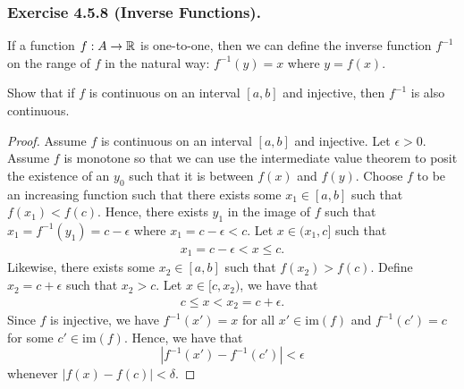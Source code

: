 \subsubsection{Exercise 4.5.8 (Inverse Functions).} If a function \( f: A \to \mathbb{R}  \) is one-to-one, then we can define the inverse function \( f^{-1}  \) on the range of \( f  \) in the natural way: \( f^{-1}(y) = x  \) where \( y = f(x)  \).

Show that if \( f  \) is continuous on an interval \( [a,b]  \) and injective, then \( f^{-1}  \) is also continuous.
\begin{proof}
    Assume \( f  \) is continuous on an interval \( [a,b] \) and injective. Let \( \epsilon > 0  \). Assume \( f  \) is monotone so that we can use the intermediate value theorem to posit the existence of an \( y_0  \) such that it is between \( f(x)  \) and \( f(y) \). Choose \( f  \) to be an increasing function such that there exists some \( x_1 \in [a,b] \) such that \( f(x_1) < f(c)  \). Hence, there exists \(  y_1  \) in the image of \( f  \) such that \( x_1 = f^{-1}(y_1) =  c - \epsilon  \) where \( x_1 = c - \epsilon  < c  \). Let \( x \in (x_1,c] \) such that 
    \begin{align}
        x_1 = c - \epsilon < x \leq c. 
    \end{align}
    Likewise, there exists some \( x_2 \in [a,b]  \) such that \( f(x_2) > f(c) \). Define \( x_2 = c + \epsilon  \) such that \( x_2 > c  \). Let \( x \in [c, x_2) \), we have that 
    \begin{align}
        c \leq x < x_2 = c + \epsilon. 
    \end{align}
    Since \( f  \) is injective, we have \( f^{-1}(x') = x \) for all \( x' \in \text{im}(f) \) and \( f^{-1}(c') = c  \) for some \( c' \in \text{im}(f) \). Hence, we have that 
    \[ | f^{-1}(x') - f^{-1}(c')  | < \epsilon  \]
    whenever \( | f(x) - f(c) | < \delta \).
\end{proof}


